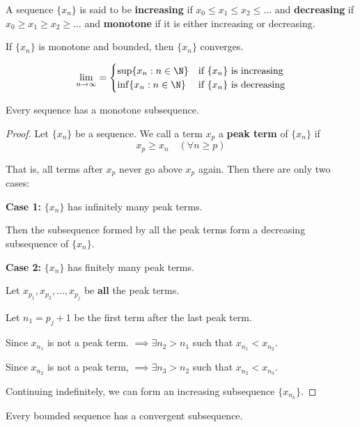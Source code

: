 \label{b5fad69}

A sequence $\{x_n\}$ is said to be \textbf{increasing} if $x_0\leq x_1\leq
x_2\leq\ldots$ and \textbf{decreasing} if $x_0\geq x_1\geq x_2\geq\ldots$ and
\textbf{monotone} if it is either increasing or decreasing.

\label{ca25eb7}

If $\{x_n\}$ is monotone and bounded, then $\{x_n\}$ converges.

$$
  \lim_{n\to\infty}=\begin{cases}
    \sup\{x_n:n\in\N\} & \text{if $\{x_n\}$ is increasing} \\
    \inf\{x_n:n\in\N\} & \text{if $\{x_n\}$ is decreasing}
  \end{cases}
$$

\label{dddb70e}

Every sequence has a monotone subsequence.

\begin{proof}
  \def\xn{\{x_n\}}

  Let $\xn$ be a sequence. We call a term $x_p$ a \textbf{peak term} of $\xn$ if
  $$x_p\geq x_n\quad(\forall n\geq p)$$

  That is, all terms after $x_p$ never go above $x_p$ again. Then there are only
  two cases:

  \textbf{Case 1:} $\xn$ has infinitely many peak terms.

  Then the subsequence formed by all the peak terms form a decreasing subsequence
  of $\xn$.

  \textbf{Case 2:} $\xn$ has finitely many peak terms.

  Let $x_{p_1},x_{p_2},\ldots,x_{p_j}$ be \textbf{all} the peak terms.

  Let $n_1=p_j+1$ be the first term after the last peak term.

  Since $x_{n_1}$ is not a peak term. $\implies\exists n_2>n_1$ such that
  $x_{n_1}<x_{n_2}$.

  Since $x_{n_2}$ is not a peak term, $\implies\exists n_3>n_2$ such that
  $x_{n_2}<x_{n_3}$.

  Continuing indefinitely, we can form an increasing subsequence $\{x_{n_k}\}$.
\end{proof}

\label{d277ad0}

Every bounded sequence has a convergent subsequence.

